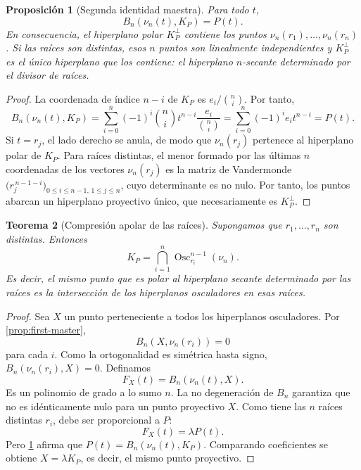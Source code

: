\documentclass[11pt,oneside]{scrartcl}
\theoremstyle{plainblue}
\newtheorem{theorem}{Teorema}[section]
\newtheorem{proposition}[theorem]{Proposición}
\theoremstyle{definitionblue}
\theoremstyle{remarkgray}
\newcommand{\Osc}{\operatorname{Osc}}
\begin{document}
\begin{proposition}[Segunda identidad maestra]\label{prop:second-master}
Para todo \(t\),
\begin{equation}\label{eq:second-master}
B_n(\nu_n(t),K_P)=P(t).
\end{equation}
En consecuencia, el hiperplano polar \(K_P^\perp\) contiene los puntos
\(\nu_n(r_1),\dots,\nu_n(r_n)\). Si las raíces son distintas, esos \(n\) puntos
son linealmente independientes y \(K_P^\perp\) es el único hiperplano que los
contiene: el hiperplano \(n\)-secante determinado por el divisor de raíces.
\end{proposition}

\begin{proof}
La coordenada de índice \(n-i\) de \(K_P\) es \(e_i/\binom ni\). Por tanto,
\[
B_n(\nu_n(t),K_P)
=\sum_{i=0}^{n}(-1)^i\binom ni t^{n-i}\frac{e_i}{\binom ni}
=\sum_{i=0}^{n}(-1)^ie_it^{n-i}=P(t).
\]
Si \(t=r_j\), el lado derecho se anula, de modo que \(\nu_n(r_j)\) pertenece al
hiperplano polar de \(K_P\). Para raíces distintas, el menor formado por las últimas \(n\) coordenadas de
los vectores \(\nu_n(r_j)\) es la matriz de Vandermonde
\(\bigl(r_j^{\,n-1-i}\bigr)_{0\le i\le n-1,\,1\le j\le n}\), cuyo
determinante es no nulo. Por tanto, los puntos
abarcan un hiperplano proyectivo único, que necesariamente es \(K_P^\perp\).
\end{proof}

\begin{theorem}[Compresión apolar de las raíces]\label{thm:KP-intersection}
Supongamos que \(r_1,\dots,r_n\) son distintas. Entonces
\begin{equation}\label{eq:KP-intersection}
\boxed{
K_P=\bigcap_{i=1}^{n}\Osc_{r_i}^{n-1}(\nu_n).}
\end{equation}
Es decir, el mismo punto que es polar al hiperplano secante determinado por las raíces
es la intersección de los hiperplanos osculadores en esas raíces.
\end{theorem}

\begin{proof}
Sea \(X\) un punto perteneciente a todos los hiperplanos osculadores. Por
\cref{prop:first-master},
\[
B_n(X,\nu_n(r_i))=0
\]
para cada \(i\). Como la ortogonalidad es simétrica hasta signo,
\(B_n(\nu_n(r_i),X)=0\). Definamos
\[
F_X(t)=B_n(\nu_n(t),X).
\]
Es un polinomio de grado a lo sumo \(n\). La no degeneración de \(B_n\) garantiza
que no es idénticamente nulo para un punto proyectivo \(X\). Como tiene las \(n\)
raíces distintas \(r_i\), debe ser proporcional a \(P\):
\[
F_X(t)=\lambda P(t).
\]
Pero \cref{prop:second-master} afirma que \(P(t)=B_n(\nu_n(t),K_P)\). Comparando
coeficientes se obtiene \(X=\lambda K_P\), es decir, el mismo punto proyectivo.
\end{proof}
\end{document}
